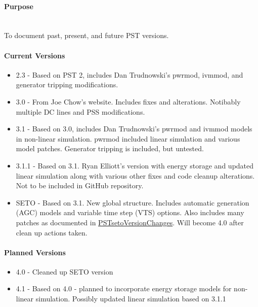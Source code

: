 \documentclass[12pt]{article}
\begin{document}
\onehalfspacing
\raggedright
\paragraph{Purpose} \ \\
To document past, present, and future PST versions.

\paragraph{Current Versions}
\begin{itemize}
\item 2.3 - Based on PST 2, includes Dan Trudnowski's pwrmod, ivmmod, and generator tripping modifications.
\item 3.0 - From Joe Chow's website. 
Includes fixes and alterations. Notibably multiple DC lines and PSS modifications.
\item 3.1 - Based on 3.0, includes Dan Trudnowski's pwrmod and ivmmod models in non-linear simulation. 
pwrmod included linear simulation and various model patches. 
Generator tripping is included, but untested.
\item 3.1.1 - Based on 3.1. Ryan Elliott's version with energy storage and updated linear simulation along with various other fixes and code cleanup alterations. 
Not to be included in GitHub repository.
\item SETO - Based on 3.1. New global structure. 
Includes automatic generation (AGC) models and variable time step (VTS) options. 
Also includes many patches as documented in 
\href{https://github.com/thadhaines/MT-Tech-SETO/tree/master/researchDocs/TEX/one-offs/200709-PSTsetoVersionChanges}{PSTsetoVersionChanges}. 
% 
Will become 4.0 after clean up actions taken.
\end{itemize}

\paragraph{Planned Versions}
\begin{itemize}
\item 4.0 - Cleaned up SETO version 
\item 4.1 - Based on 4.0 - planned to incorporate energy storage models for non-linear simulation. Possibly updated linear simulation based on 3.1.1
\end{itemize}
\end{document}
